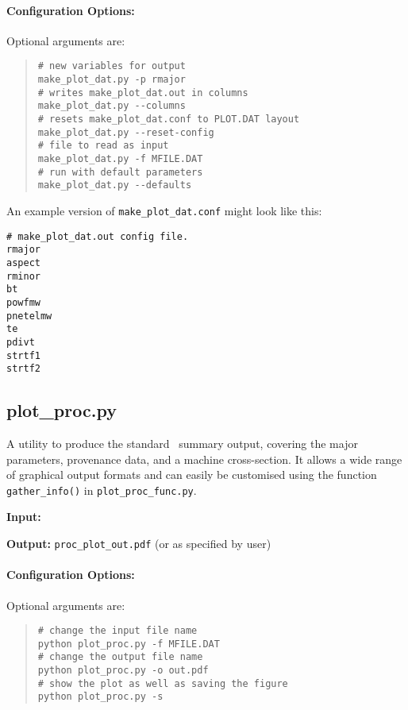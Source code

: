 \paragraph{Configuration Options:}

Optional arguments are:
\begin{quote} 
\begin{verbatim}
# new variables for output
make_plot_dat.py -p rmajor
# writes make_plot_dat.out in columns 
make_plot_dat.py --columns
# resets make_plot_dat.conf to PLOT.DAT layout
make_plot_dat.py --reset-config
# file to read as input
make_plot_dat.py -f MFILE.DAT 
# run with default parameters
make_plot_dat.py --defaults
\end{verbatim}
\end{quote}

An example version of \texttt{make\_plot\_dat.conf} might look like this:
\begin{framed}
\begin{verbatim}
# make_plot_dat.out config file.
rmajor
aspect
rminor
bt
powfmw
pnetelmw
te
pdivt
strtf1
strtf2
\end{verbatim}
\end{framed}

\subsection{plot\_proc.py}

A utility to produce the standard \process\ summary output, covering the major
parameters, provenance data, and a machine cross-section. It allows a wide
range of graphical output formats and can easily be customised using the
function \texttt{gather\_info()} in \texttt{plot\_proc\_func.py}.

\begin{description}
\item{\textbf{Input:}}
 \mfile
                                
\item{\textbf{Output:}}
\verb|proc_plot_out.pdf| (or as specified by user)
\end{description}

\paragraph{Configuration Options:}

Optional arguments are:
\begin{quote}
\begin{verbatim}
# change the input file name
python plot_proc.py -f MFILE.DAT 
# change the output file name
python plot_proc.py -o out.pdf
# show the plot as well as saving the figure
python plot_proc.py -s 
\end{verbatim}
\end{quote}

